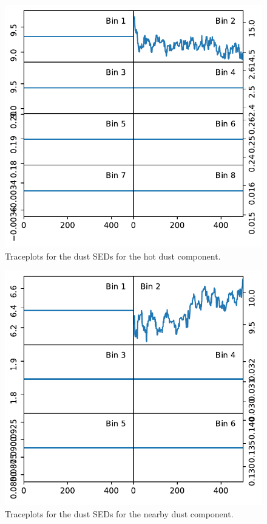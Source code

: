\documentclass{aa}
\begin{document}
\begin{figure}
    \centering
    \includegraphics[width=\columnwidth]{"figures/traceplots_dust_seds_hot_dust.pdf"}
    \caption{Traceplots for the dust SEDs for the hot dust component.}
    \label{fig:traceplots_dust_seds_hotdust}
\end{figure}

\begin{figure}
    \centering
    \includegraphics[width=\columnwidth]{"figures/traceplots_dust_seds_nearby_dust.pdf"}
    \caption{Traceplots for the dust SEDs for the nearby dust component.}
    \label{fig:traceplots_dust_seds_nearbydust}
\end{figure}
\end{document}
